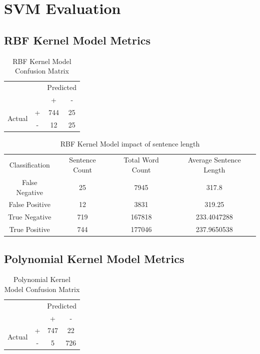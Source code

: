 \section{SVM Evaluation}\label{app:svm_evaluation}
\subsection{RBF Kernel Model Metrics}
\begin{table}[h!]
    \centering
    \begin{tabular}[h]{c c|c|c|}
        \cline{3-4}
        & & \multicolumn{2}{c|}{Predicted} \\
        \cline{3-4}
        & & + & - \\
        \hline
        \multicolumn{1}{|c|}{\multirow{2}{3em}{Actual}} & + & 744 & 25 \\
        \cline{2-4}
        \multicolumn{1}{|c|}{} & - & 12 & 25 \\
        \hline
    \end{tabular}
    \caption{\label{tab:rbf_confusion}RBF Kernel Model Confusion Matrix}
\end{table}

\begin{table}[h!]
    \centering
    \begin{tabular}[h]{c|c|c|c}
        Classification & Sentence Count & Total Word Count & Average Sentence Length\\
        False Negative & 25 & 7945 & 317.8\\
        False Positive & 12 & 3831 & 319.25\\
        True Negative & 719 & 167818 & 233.4047288\\
        True Positive & 744 & 177046 & 237.9650538\\
    \end{tabular}
    \caption{\label{tab:rbf_wc}RBF Kernel Model impact of sentence length}
\end{table}

\subsection{Polynomial Kernel Model Metrics}
\begin{table}[h!]
    \centering
    \begin{tabular}[h]{c c|c|c|}
        \cline{3-4}
        & & \multicolumn{2}{c|}{Predicted} \\
        \cline{3-4}
        & & + & - \\
        \hline
        \multicolumn{1}{|c|}{\multirow{2}{3em}{Actual}} & + & 747 & 22 \\
        \cline{2-4}
        \multicolumn{1}{|c|}{} & - & 5 & 726 \\
        \hline
    \end{tabular}
    \caption{\label{tab:poly_confusion}Polynomial Kernel Model Confusion Matrix}
\end{table}

